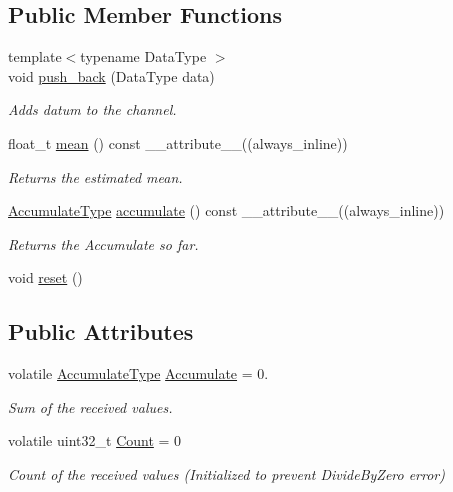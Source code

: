 \subsection*{Public Member Functions}
\begin{DoxyCompactItemize}
\item 
{\footnotesize template$<$typename Data\+Type $>$ }\\void \hyperlink{classMonitorChannel_3_01true_01_4_a5de2067c26c85de95bcaafe396a72471}{push\+\_\+back} (Data\+Type data)
\begin{DoxyCompactList}\small\item\em Adds datum to the channel. \end{DoxyCompactList}\item 
float\+\_\+t \hyperlink{classMonitorChannel_3_01true_01_4_a7b95a313ea0263842ff6190d38ff7d7f}{mean} () const \+\_\+\+\_\+attribute\+\_\+\+\_\+((always\+\_\+inline))
\begin{DoxyCompactList}\small\item\em Returns the estimated mean. \end{DoxyCompactList}\item 
\hyperlink{classMonitorChannel_3_01true_01_4_af2569e58417243595e129831ac287351}{Accumulate\+Type} \hyperlink{classMonitorChannel_3_01true_01_4_ade0e235d1f9f6f1624d898e8047b4026}{accumulate} () const \+\_\+\+\_\+attribute\+\_\+\+\_\+((always\+\_\+inline))
\begin{DoxyCompactList}\small\item\em Returns the {\ttfamily Accumulate} so far. \end{DoxyCompactList}\item 
void \hyperlink{classMonitorChannel_3_01true_01_4_a4d555de31d53efa329c4598538da59e7}{reset} ()
\end{DoxyCompactItemize}
\subsection*{Public Attributes}
\begin{DoxyCompactItemize}
\item 
volatile \hyperlink{classMonitorChannel_3_01true_01_4_af2569e58417243595e129831ac287351}{Accumulate\+Type} \hyperlink{classMonitorChannel_3_01true_01_4_a8453948b697c84ac31a0d3d6305e7e9a}{Accumulate} = 0.
\begin{DoxyCompactList}\small\item\em Sum of the received values. \end{DoxyCompactList}\item 
volatile uint32\+\_\+t \hyperlink{classMonitorChannel_3_01true_01_4_a7c4f5908f8b795e1a951cc8224a68de7}{Count} = 0
\begin{DoxyCompactList}\small\item\em Count of the received values (Initialized to prevent Divide\+By\+Zero error) \end{DoxyCompactList}\end{DoxyCompactItemize}
